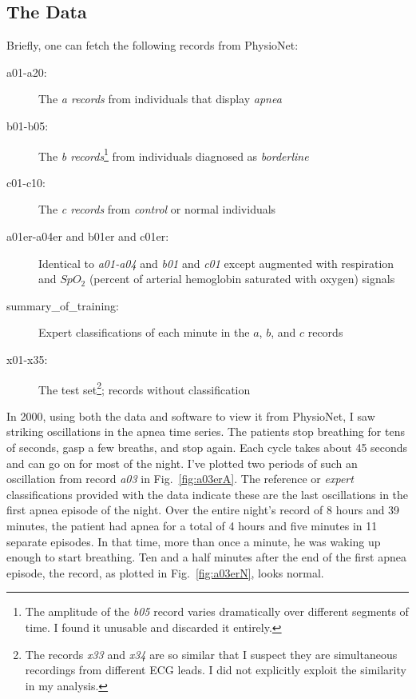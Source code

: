 \documentclass[]{article}
\begin{document}
\subsection{The Data}\label{sec:data}

Briefly, one can fetch the following records from PhysioNet:
\begin{description}
\item[a01-a20:] The \emph{a records} from individuals that display
  \emph{apnea}
\item[b01-b05:] The \emph{b records}\footnote{The amplitude of the
    \emph{b05} record varies dramatically over different segments of
    time.  I found it unusable and discarded it entirely.} from
  individuals diagnosed as \emph{borderline}
\item[c01-c10:] The \emph{c records} from \emph{control} or normal
  individuals
\item[a01er-a04er and b01er and c01er:] Identical to \emph{a01-a04}
  and \emph{b01} and \emph{c01} except augmented with respiration and
  $SpO_2$ (percent of arterial hemoglobin saturated with oxygen)
   signals
\item[summary\_of\_training:] Expert classifications of each minute in
  the $a$, $b$, and $c$ records
\item[x01-x35:] The test set\footnote{The records \emph{x33} and
    \emph{x34} are so similar that I suspect they are simultaneous
    recordings from different ECG leads.  I did not explicitly exploit
  the similarity in my analysis.}; records without classification
\end{description}

In 2000, using both the data and software to view it from PhysioNet, I
saw striking oscillations in the apnea time series.  The patients stop
breathing for tens of seconds, gasp a few breaths, and stop again.
Each cycle takes about 45 seconds and can go on for most of the night.
I've plotted two periods of such an oscillation from record \emph{a03}
in Fig.~\ref{fig:a03erA}.  The reference or \emph{expert}
classifications provided with the data indicate these are the last
oscillations in the first apnea episode of the night.  Over the entire
night's record of 8 hours and 39 minutes, the patient had apnea for a
total of 4 hours and five minutes in 11 separate episodes.  In that
time, more than once a minute, he was waking up enough to start
breathing.  Ten and a half minutes after the end of the first apnea
episode, the record, as plotted in Fig.~\ref{fig:a03erN}, looks
normal.
\end{document}
